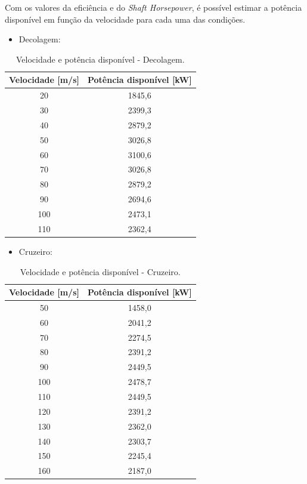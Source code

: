 Com os valores da eficiência e do \textit{Shaft Horsepower}, é possível estimar a potência disponível em função da velocidade para cada uma das condições.

\begin{itemize}
    \item{Decolagem:}
\end{itemize}

\begin{table}[H]
\centering
\caption{Velocidade e potência disponível - Decolagem.}
\begin{tabular}{cc}
\hline
Velocidade [m/s] & Potência disponível [kW] \\
\hline
20 & 1845{,}6 \\
30 & 2399{,}3 \\
40 & 2879{,}2 \\
50 & 3026{,}8 \\
60 & 3100{,}6 \\
70 & 3026{,}8 \\
80 & 2879{,}2 \\
90 & 2694{,}6 \\
100 & 2473{,}1 \\
110 & 2362{,}4 \\
\hline
\end{tabular}
\end{table}

\clearpage

\begin{itemize}
    \item{Cruzeiro:}
\end{itemize}

\begin{table}[H]
\centering
\caption{Velocidade e potência disponível - Cruzeiro.}
\begin{tabular}{cc}
\hline
Velocidade [m/s] & Potência disponível [kW] \\
\hline
50 & 1458{,}0 \\
60 & 2041{,}2 \\
70 & 2274{,}5 \\
80 & 2391{,}2 \\
90 & 2449{,}5 \\
100 & 2478{,}7 \\
110 & 2449{,}5 \\
120 & 2391{,}2 \\
130 & 2362{,}0 \\
140 & 2303{,}7 \\
150 & 2245{,}4 \\
160 & 2187{,}0 \\
\hline
\end{tabular}
\end{table}

